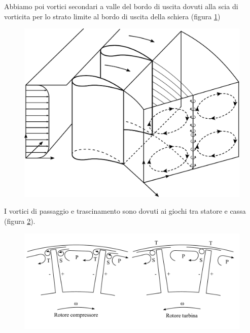 Abbiamo poi vortici secondari a valle del bordo di uscita dovuti alla scia di vorticita per lo strato limite al bordo di uscita della schiera (figura \ref{fd:VortVall})
\begin{figure}[h!]
\centering
  \includegraphics[width=.7\textwidth]{fig/VortVall.pdf}
\caption{}
\label{fd:VortVall}
\end{figure}
I vortici di passaggio e trascinamento sono dovuti ai giochi tra statore e cassa (figura \ref{fd:VortTraf}).
\begin{figure}[h!]
\centering
  \includegraphics[width=.8\textwidth]{fig/VortTraf.pdf}
\caption{}
\label{fd:VortTraf}
\end{figure}